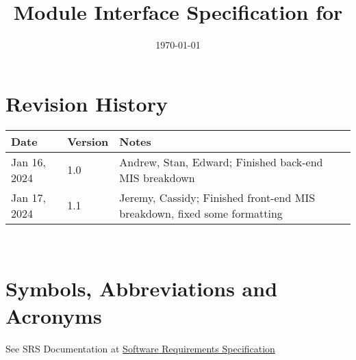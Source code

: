 \documentclass[12pt, titlepage]{article}
\begin{document}
\title{Module Interface Specification for \progname{}}

\author{\authname}

\date{\today}

\maketitle


\section{Revision History}

\begin{tabularx}{\textwidth}{p{3cm}p{2cm}X}
\toprule {\bf Date} & {\bf Version} & {\bf Notes}\\
\midrule
Jan 16, 2024 & 1.0 & Andrew, Stan, Edward; Finished back-end MIS breakdown\\
Jan 17, 2024 & 1.1 & Jeremy, Cassidy; Finished front-end MIS breakdown, fixed some formatting \\
\bottomrule
\end{tabularx}

~\newpage

\section{Symbols, Abbreviations and Acronyms}

See SRS Documentation at \href{https://github.com/stanreee/sign-language-learning/blob/main/docs/SRS/SRS.pdf}{Software Requirements Specification} \\
\end{document}
